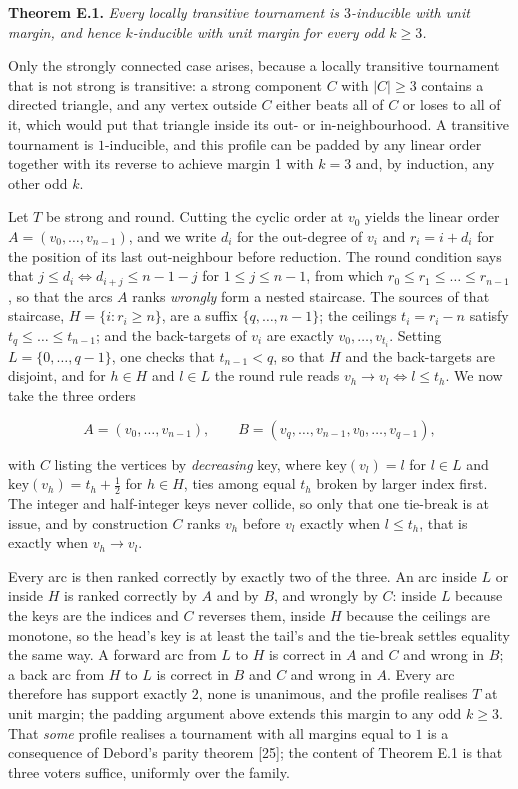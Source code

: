 \documentclass[
]{article}
\newcounter{none} %
\begin{document}
\textbf{Theorem E.1.} \emph{Every locally transitive tournament is
\(3\)-inducible with unit margin, and hence \(k\)-inducible with unit
margin for every odd \(k \ge 3\).}

Only the strongly connected case arises, because a locally transitive
tournament that is not strong is transitive: a strong component \(C\)
with \(|C| \geq 3\) contains a directed triangle, and any vertex outside
\(C\) either beats all of \(C\) or loses to all of it, which would put
that triangle inside its out- or in-neighbourhood. A transitive
tournament is \(1\)-inducible, and this profile can be padded by any
linear order together with its reverse to achieve margin 1 with
\(k = 3\) and, by induction, any other odd \(k\).

Let \(T\) be strong and round. Cutting the cyclic order at \(v_0\)
yields the linear order \(A = (v_0, \dots, v_{n-1})\), and we write
\(d_i\) for the out-degree of \(v_i\) and \(r_i = i + d_i\) for the
position of its last out-neighbour before reduction. The round condition
says that \(j \le d_i \iff d_{i+j} \le n-1-j\) for \(1 \le j \le n-1\),
from which \(r_0 \le r_1 \le \dots \le r_{n-1}\), so that the arcs \(A\)
ranks \emph{wrongly} form a nested staircase. The sources of that
staircase, \(H = \{i : r_i \ge n\}\), are a suffix
\(\{q, \dots, n-1\}\); the ceilings \(t_i = r_i - n\) satisfy
\(t_q \le \dots \le t_{n-1}\); and the back-targets of \(v_i\) are
exactly \(v_0, \dots, v_{t_i}\). Setting \(L = \{0, \dots, q-1\}\), one
checks that \(t_{n-1} < q\), so that \(H\) and the back-targets are
disjoint, and for \(h \in H\) and \(l \in L\) the round rule reads
\(v_h \to v_l \iff l \le t_h\). We now take the three orders

\[A = (v_0, \dots, v_{n-1}), \qquad B = (v_q, \dots, v_{n-1}, v_0, \dots, v_{q-1}),\]

with \(C\) listing the vertices by \emph{decreasing} key, where
\(\mathrm{key}(v_l) = l\) for \(l \in L\) and
\(\mathrm{key}(v_h) = t_h + \tfrac12\) for \(h \in H\), ties among equal
\(t_h\) broken by larger index first. The integer and half-integer keys
never collide, so only that one tie-break is at issue, and by
construction \(C\) ranks \(v_h\) before \(v_l\) exactly when
\(l \le t_h\), that is exactly when \(v_h \to v_l\).

Every arc is then ranked correctly by exactly two of the three. An arc
inside \(L\) or inside \(H\) is ranked correctly by \(A\) and by \(B\),
and wrongly by \(C\): inside \(L\) because the keys are the indices and
\(C\) reverses them, inside \(H\) because the ceilings are monotone, so
the head's key is at least the tail's and the tie-break settles equality
the same way. A forward arc from \(L\) to \(H\) is correct in \(A\) and
\(C\) and wrong in \(B\); a back arc from \(H\) to \(L\) is correct in
\(B\) and \(C\) and wrong in \(A\). Every arc therefore has support
exactly \(2\), none is unanimous, and the profile realises \(T\) at unit
margin; the padding argument above extends this margin to any odd
\(k \geq 3\). That \emph{some} profile realises a tournament with all
margins equal to \(1\) is a consequence of Debord's parity theorem
{[}25{]}; the content of Theorem E.1 is that three voters suffice,
uniformly over the family.
\end{document}
